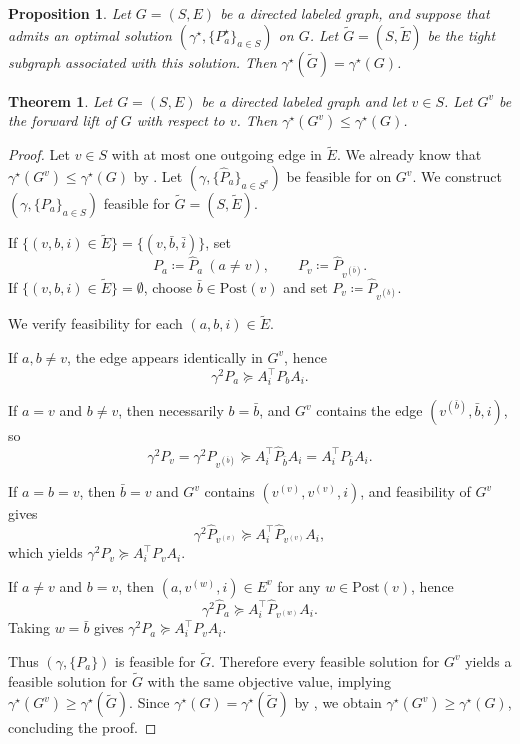 \documentclass[10pt,a4paper]{amsart}
\newtheorem{theorem}{Theorem}
\newtheorem{proposition}{Proposition}
\begin{document}
\begin{proposition}
\label{prop:opt_tight}
Let $G=(S,E)$ be a directed labeled graph, and suppose that  admits an optimal solution $(\gamma^\star ,\{P_a^\star \}_{a\in S})$ on $G$. Let $\tilde G=(S,\tilde E)$ be the tight subgraph associated with this solution.
Then $\gamma^\star (\tilde G) = \gamma^\star (G)$.
\end{proposition}

\begin{theorem}
\label{thm:relaxation_forward}
Let $G=(S,E)$ be a directed labeled graph and let $v\in S$.
Let $G^v$ be the forward lift of $G$ with respect to $v$.
Then $\gamma^\star (G^v) \le \gamma^\star (G)$.
\end{theorem}

\begin{proof}
Let $v\in S$ with at most one outgoing edge in $\tilde E$. We already know that $\gamma^\star (G^v)\le\gamma^\star (G)$ by
. Let
$(\gamma,\{\hat P_a\}_{a\in S^v})$ be feasible for
 on $G^v$. We construct
$(\gamma,\{P_a\}_{a\in S})$ feasible for $\tilde G=(S,\tilde E)$.

If $\{(v,b,i)\in\tilde E\}=\{(v,\bar b,\bar i)\}$, set
\[
P_a\coloneqq\hat P_a \ (a\neq v),\qquad
P_v\coloneqq\hat P_{v^{(\bar b)}} .
\]
If $\{(v,b,i)\in\tilde E\}=\emptyset$, choose
$\bar b\in\mathrm{Post}(v)$ and set $P_v\coloneqq\hat P_{v^{(\bar b)}}$.

We verify feasibility for each $(a,b,i)\in\tilde E$.

If $a,b\neq v$, the edge appears identically in $G^v$, hence
\[
\gamma^2 P_a\succeq A_i^\top P_b A_i .
\]

If $a=v$ and $b\neq v$, then necessarily $b=\bar b$, and $G^v$
contains the edge $(v^{(\bar b)},\bar b,i)$, so
\[
\gamma^2 P_v=\gamma^2 \hat P_{v^{(\bar b)}}\succeq A_i^\top \hat P_{\bar b} A_i=A_i^\top P_{\bar b} A_i.
\]

If $a=b=v$, then $\bar b=v$ and $G^v$ contains
$(v^{(v)},v^{(v)},i)$, and feasibility of $G^v$ gives
\[
\gamma^2 \hat P_{v^{(v)}}\succeq A_i^\top \hat P_{v^{(v)}} A_i ,
\]
which yields $\gamma^2 P_v\succeq A_i^\top P_v A_i$.

If $a\neq v$ and $b=v$, then $(a,v^{(w)},i)\in E^v$ for any
$w\in\mathrm{Post}(v)$, hence
\[
\gamma^2 \hat P_a\succeq A_i^\top \hat P_{v^{(w)}} A_i .
\]
Taking $w=\bar b$ gives $\gamma^2 P_a\succeq A_i^\top P_v A_i$.

Thus $(\gamma,\{P_a\})$ is feasible for $\tilde G$. Therefore every feasible solution for $G^v$ yields a feasible solution for $\tilde G$ with the same objective value, implying $\gamma^\star (G^v)\ge\gamma^\star (\tilde G)$. Since
$\gamma^\star (G)=\gamma^\star (\tilde G)$ by ,
we obtain $\gamma^\star (G^v)\ge\gamma^\star (G)$, concluding the proof.
\end{proof}
\end{document}
